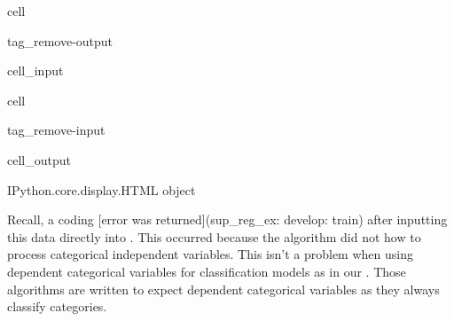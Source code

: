 \documentclass[letterpaper,10pt,english]{jupyterBook}
\begin{document}
\begin{sphinxuseclass}{cell}
\begin{sphinxuseclass}{tag_remove-output}\begin{sphinxVerbatimInput}

\begin{sphinxuseclass}{cell_input}
\begin{sphinxVerbatim}[commandchars=\\\{\}]
  \PYG{p}{[}  \PYG{p}{]}
\end{sphinxVerbatim}

\end{sphinxuseclass}\end{sphinxVerbatimInput}

\end{sphinxuseclass}
\end{sphinxuseclass}
\begin{sphinxuseclass}{cell}
\begin{sphinxuseclass}{tag_remove-input}\begin{sphinxVerbatimOutput}

\begin{sphinxuseclass}{cell_output}
\begin{sphinxVerbatim}[commandchars=\\\{\}]
\PYGZlt{}IPython.core.display.HTML object\PYGZgt{}
\end{sphinxVerbatim}

\end{sphinxuseclass}\end{sphinxVerbatimOutput}

\end{sphinxuseclass}
\end{sphinxuseclass}
\sphinxAtStartPar
Recall, a coding {[}error was returned{]}(sup\_reg\_ex: develop: train) after inputting this data directly into . This occurred because the algorithm did not how to process categorical independent variables. This isn’t a problem when using dependent categorical variables for classification models as in our {\hyperref[\detokenize{task2_c/example_sup_class/sup_class_ex-develop:sup-class-ex-develop}]{}}. Those algorithms are written to expect dependent categorical variables \sphinxhyphen{}as they always classify categories.
\end{document}
